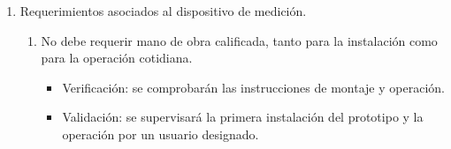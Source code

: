 \documentclass[
11pt, %
]{charter}
\begin{document}
%
\begin{enumerate}
	\item Requerimientos asociados al dispositivo de medición.
		\begin{enumerate}
			\item No debe requerir mano de obra calificada, tanto para la instalación como para la operación cotidiana.
			\begin{itemize}
				\item Verificación: se comprobarán las instrucciones de montaje y operación.
				\item Validación: se supervisará la primera instalación del prototipo y la operación por un usuario designado.
			\end{itemize}


\end{enumerate}
\end{enumerate}
\end{document}
